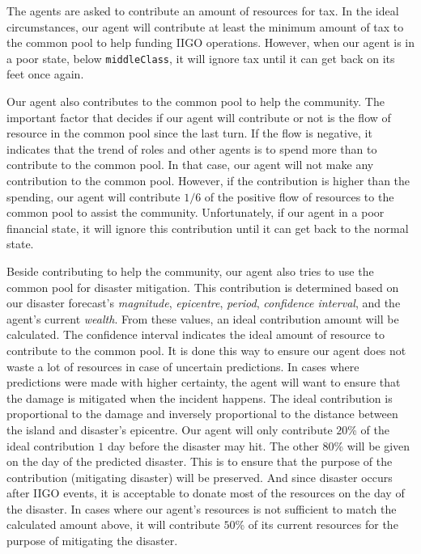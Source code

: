 The agents are asked to contribute an amount of resources for tax. In the ideal circumstances, our agent will contribute at least the minimum amount of tax to the common pool to help funding IIGO operations. However, when our agent is in a poor state, below \texttt{middleClass}, it will ignore tax until it can get back on its feet once again. \newline

Our agent also contributes to the common pool to help the community. The important factor that decides if our agent will contribute or not is the flow of resource in the common pool since the last turn. If the flow is negative, it indicates that the trend of roles and other agents is to spend more than to contribute to the common pool. In that case, our agent will not make any contribution to the common pool. However, if the contribution is higher than the spending, our agent will contribute $1/6$ of the positive flow of resources to the common pool to assist the community. Unfortunately, if our agent in a poor financial state, it will ignore this contribution until it can get back to the normal state. \newline

Beside contributing to help the community, our agent also tries to use the common pool for disaster mitigation. This contribution is determined based on our disaster forecast's \textit{magnitude}, \textit{epicentre}, \textit{period}, \textit{confidence interval},  and the agent's current \textit{wealth}. From these values, an ideal contribution amount will be calculated. The confidence interval indicates the ideal amount of resource to contribute to the common pool. It is done this way to ensure our agent does not waste a lot of resources in case of uncertain predictions. In cases where predictions were made with higher certainty, the agent will want to ensure that the damage is mitigated when the incident happens. The ideal contribution is proportional to the damage and inversely proportional to the distance between the island and disaster's epicentre. Our agent will only contribute $20$\% of the ideal contribution $1$ day before the disaster may hit. The other $80$\% will be given on the day of the predicted disaster. This is to ensure that the purpose of the contribution (mitigating disaster) will be preserved. And since disaster occurs after IIGO events, it is acceptable to donate most of the resources on the day of the disaster. In cases where our agent's resources is not sufficient to match the calculated amount above, it will contribute $50$\% of its current resources for the purpose of mitigating the disaster. \newline

